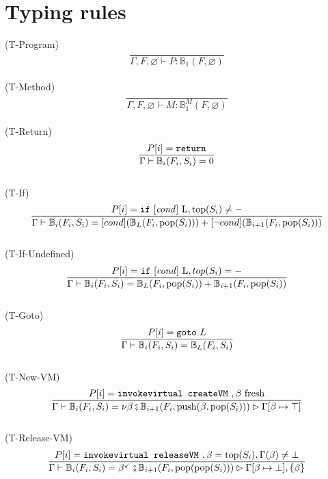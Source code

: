 \documentclass{amsart}
\newcommand{\bB}[1]{\mathbb{B}_{#1}}
\renewcommand{\emptyset}{\varnothing}
\numberwithin{equation}{section}
\theoremstyle{plain} %
\theoremstyle{definition}
\theoremstyle{remark}
\begin{document}
\newpage
\section{Typing rules}
(T-Program)
\begin{equation*}
\frac{}
{\Gamma, F,\emptyset \vdash P: \bB{1}(F, \emptyset)}
\end{equation*}
\\
(T-Method)
\begin{equation*}
\frac{} %
{\Gamma, F,\emptyset \vdash M: \bB{1}^M(F, \emptyset)}
\end{equation*}
\\
(T-Return)
\begin{equation*}
\frac{P[i] = \text{\texttt{return}}}
{\Gamma \vdash \bB{i}(F_i, S_i) = 0}
\end{equation*}
\\
(T-If)
\begin{equation*}\frac{P[i] = \text{\texttt{if} [\emph{cond}] L}, \text{top}(S_i) \neq -}
{\Gamma \vdash \bB{i}(F_i, S_i) = [cond] (\bB{L}(F_i, \text{pop}(S_i))) +
 [\neg cond] (\bB{i+1}(F_i, \text{pop}(S_i)))}
\end{equation*}
\\
(T-If-Undefined)
\begin{equation*}\frac{P[i] = \text{\texttt{if} [\emph{cond}] L}, top(S_i) = -}
{\Gamma \vdash \bB{i}(F_i, S_i) = \bB{L}(F_i, \text{pop}(S_i)) + \bB{i+1}(F_i, \text{pop}(S_i))}
\end{equation*}
\\
(T-Goto)
\begin{equation*}
\frac{P[i] = \text{\texttt{goto} $L$}}
{\Gamma \vdash \bB{i}(F_i, S_i) = \bB{L}(F_i, S_i)}
\end{equation*}
\\
(T-New-VM)
\begin{equation*}\frac{
P[i] = \text{\texttt{invokevirtual createVM} }, \beta \text{ fresh}}
{\Gamma \vdash \bB{i}(F_i, S_i) = \nu \beta \fatsemi \bB{i+1}(F_i, \text{push}(\beta,\text{pop}(S_i))) \rhd \Gamma[\beta \mapsto \top]}
\end{equation*}
\\
(T-Release-VM)
\begin{equation*}
\frac{P[i] = \text{\texttt{invokevirtual releaseVM} }, \beta = \text{top}(S_i), \Gamma(\beta) \neq \bot}
{\Gamma \vdash \bB{i}(F_i, S_i) = \beta^{\checkmark} \fatsemi \bB{i+1}(F_i, \text{pop(pop}(S_i))) \rhd \Gamma[\beta \mapsto \bot], \{\beta\}}
\end{equation*}
\end{document}
